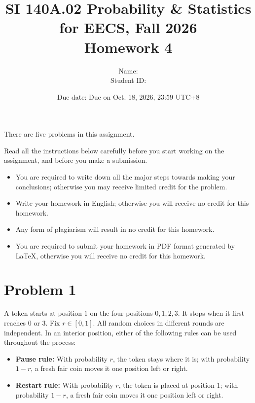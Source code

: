 \documentclass[11pt,a4paper]{article}
\title{SI 140A.02 Probability \& Statistics for EECS, Fall 2026\\[0.4em]Homework 4}
\author{Name: \underline{\hspace{2.2in}}\\[0.8em]Student ID: \underline{\hspace{1.9in}}}
\date{
Due date: Due on Oct. 18, 2026, 23:59 UTC+8}
\begin{document}
\maketitle
\thispagestyle{plain}
\vspace{1em}
There are five problems in this assignment.

Read all the instructions below carefully before you start working on the assignment, and before you make a submission.
\begin{itemize}
\item You are required to write down all the major steps towards making your conclusions; otherwise you may receive limited credit for the problem.
\item Write your homework in English; otherwise you will receive no credit for this homework.
\item Any form of plagiarism will result in no credit for this homework.
\item You are required to submit your homework in PDF format generated by LaTeX, otherwise you will receive no credit for this homework.
\end{itemize}


\clearpage
\section*{Problem 1}

A token starts at position $1$ on the four positions $0,1,2,3$.
It stops when it first reaches $0$ or $3$.
Fix $r\in[0,1]$.
All random choices in different rounds are independent.
In an interior position, either of the following rules can be used
throughout the process:

\begin{itemize}
    \item \textbf{Pause rule:}
    With probability $r$, the token stays where it is;
    with probability $1-r$, a fresh fair coin moves it
    one position left or right.

    \item \textbf{Restart rule:}
    With probability $r$, the token is placed at position $1$;
    with probability $1-r$, a fresh fair coin moves it
    one position left or right.
\end{itemize}
\end{document}

